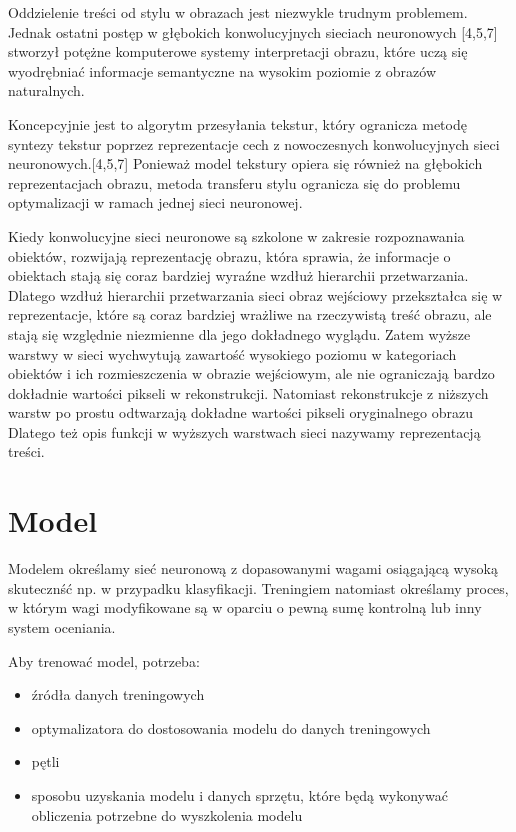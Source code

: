 \documentclass[brudnopis]{xmgr}
\begin{document}
Oddzielenie treści od stylu w obrazach jest niezwykle trudnym problemem. Jednak ostatni postęp w głębokich konwolucyjnych sieciach neuronowych [4,5,7] stworzył potężne komputerowe systemy interpretacji obrazu, które uczą się wyodrębniać informacje semantyczne na wysokim poziomie z obrazów naturalnych.

Koncepcyjnie jest to algorytm przesyłania tekstur, który ogranicza metodę syntezy tekstur poprzez reprezentacje cech z nowoczesnych konwolucyjnych sieci neuronowych.[4,5,7] Ponieważ model tekstury opiera się również na głębokich reprezentacjach obrazu, metoda transferu stylu ogranicza się do problemu optymalizacji w ramach jednej sieci neuronowej.

Kiedy konwolucyjne sieci neuronowe są szkolone w zakresie rozpoznawania obiektów, rozwijają reprezentację obrazu, która sprawia, że informacje o obiektach stają się coraz bardziej wyraźne wzdłuż hierarchii przetwarzania. Dlatego wzdłuż hierarchii przetwarzania sieci obraz wejściowy przekształca się w reprezentacje, które są coraz bardziej wrażliwe na rzeczywistą treść obrazu, ale stają się względnie niezmienne dla jego dokładnego wyglądu. Zatem wyższe warstwy w sieci wychwytują zawartość wysokiego poziomu w kategoriach obiektów i ich rozmieszczenia w obrazie wejściowym, ale nie ograniczają bardzo dokładnie wartości pikseli w rekonstrukcji. Natomiast rekonstrukcje z niższych warstw po prostu odtwarzają dokładne wartości pikseli oryginalnego obrazu Dlatego też opis funkcji w wyższych warstwach sieci nazywamy reprezentacją treści.


\section{Model\label{s:dsssl}}
Modelem określamy sieć neuronową z dopasowanymi wagami osiągającą wysoką skutecznść np. w przypadku klasyfikacji. Treningiem natomiast określamy proces, w którym wagi modyfikowane są w oparciu o pewną sumę kontrolną lub inny system oceniania.

Aby trenować model, potrzeba:

\begin{itemize}
\item źródła danych treningowych
\item optymalizatora do dostosowania modelu do danych treningowych 
\item pętli  
\item sposobu uzyskania modelu i danych sprzętu, które będą wykonywać obliczenia potrzebne do wyszkolenia modelu

\end{itemize}
\end{document}
